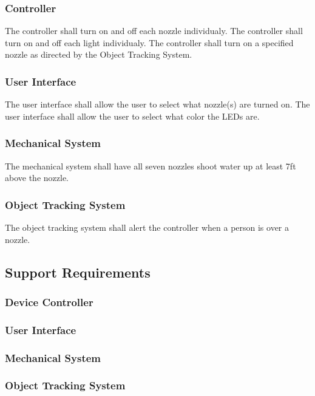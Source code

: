 \subsubsection{Controller}
The controller shall turn on and off each nozzle individualy.
The controller shall turn on and off each light individualy.
The controller shall turn on a specified nozzle as directed by the Object Tracking System.
\subsubsection{User Interface}
The user interface shall allow the user to select what nozzle(s) are turned on.
The user interface shall allow the user to select what color the LEDs are.
\subsubsection{Mechanical System}
The mechanical system shall have all seven nozzles shoot water up at least 7ft above the nozzle.
\subsubsection{Object Tracking System}
The object tracking system shall alert the controller when a person is over a nozzle.
\subsection{Support Requirements}

\subsubsection{Device Controller}

\subsubsection{User Interface}

\subsubsection{Mechanical System}

\subsubsection{Object Tracking System}



